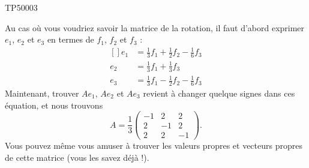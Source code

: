 \begin{corrige}{TP50003}
\begin{enumerate}
			Au cas où vous voudriez savoir la matrice de la rotation, il faut d'abord exprimer $e_1$, $e_2$ et $e_3$ en termes de $f_1$, $f_2$ et $f_3$ :
			\begin{equation}
				\begin{aligned}[]
					e_1&=\frac{1}{ 3 }f_1+\frac{1}{ 2 }f_2-\frac{1}{ 6 }f_3\\
					e_2&=\frac{1}{ 3 }f_1+\frac{1}{ 3 }f_3\\
					e_3&=\frac{1}{ 3 }f_1-\frac{1}{ 2 }f_2-\frac{1}{ 6 }f_3
				\end{aligned}
			\end{equation}
			Maintenant, trouver $Ae_1$, $Ae_2$ et $Ae_3$ revient à changer quelque signes dans ces équation, et nous trouvons
			\begin{equation}
				A=\frac{1}{ 3 }\begin{pmatrix}
					-1	&	2	&	2	\\
					2	&	-1	&	2	\\
					2	&	2	&	-1
				\end{pmatrix}.
			\end{equation}
			Vous pouvez même vous amuser à trouver les valeurs propres et vecteurs propres de cette matrice (vous les savez déjà !).


\end{enumerate}
\end{corrige}
